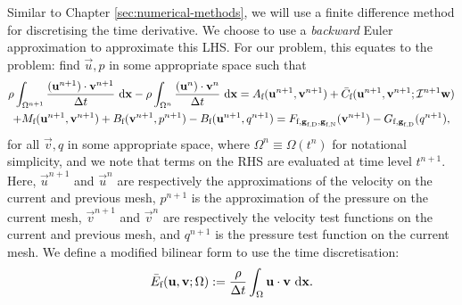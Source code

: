             Similar to Chapter \ref{sec:numerical-methods}, we will use a finite difference method for discretising the time derivative. We choose to use a \textit{backward} Euler approximation to approximate this LHS. For our problem, this equates to the problem: find $\vec{u}, p$ in some appropriate space such that
            \begin{multline*}
                \rho \int_{\Omega^{n+1}} \frac{(\boldsymbol{\mathbf{u}}^{n+1}) \cdot \boldsymbol{\mathbf{v}}^{n+1}}{\Delta t} ~\mathrm{d} \boldsymbol{\mathbf{x}} - \rho \int_{\Omega^n} \frac{(\boldsymbol{\mathbf{u}}^n) \cdot \boldsymbol{\mathbf{v}}^n}{\Delta t} ~\mathrm{d} \boldsymbol{\mathbf{x}} = A_\text{f}(\boldsymbol{\mathbf{u}}^{n+1}, \boldsymbol{\mathbf{v}}^{n+1}) + \bar{C}_\text{f}(\boldsymbol{\mathbf{u}}^{n+1}, \boldsymbol{\mathbf{v}}^{n+1}; \mathcal{I}^{n+1}\boldsymbol{\mathbf{w}}) \\ + M_\text{f}(\boldsymbol{\mathbf{u}}^{n+1}, \boldsymbol{\mathbf{v}}^{n+1}) + B_\text{f}(\boldsymbol{\mathbf{v}}^{n+1}, p^{n+1}) - B_\text{f}(\boldsymbol{\mathbf{u}}^{n+1}, q^{n+1}) = F_{\text{f},\boldsymbol{\mathbf{g}}_\text{f,D},\boldsymbol{\mathbf{g}}_\text{f,N}}(\boldsymbol{\mathbf{v}}^{n+1}) - G_{\text{f},\boldsymbol{\mathbf{g}}_\text{f,D}}(q^{n+1}),
            \end{multline*}
            for all $\vec{v}, q$ in some appropriate space, where $\Omega^n \equiv \Omega(t^n)$ for notational simplicity, and we note that terms on the RHS are evaluated at time level $t^{n+1}$. Here, $\vec{u}^{n+1}$ and $\vec{u}^n$ are respectively the approximations of the velocity on the current and previous mesh, $p^{n+1}$ is the approximation of the pressure on the current mesh, $\vec{v}^{n+1}$ and $\vec{v}^n$ are respectively the velocity test functions on the current and previous mesh, and $q^{n+1}$ is the pressure test function on the current mesh. We define a modified bilinear form to use the time discretisation:
            \begin{equation}
                \bar{E}_\text{f}(\boldsymbol{\mathbf{u}}, \boldsymbol{\mathbf{v}}; \Omega) := \frac{\rho}{\Delta t} \int_{\Omega} \boldsymbol{\mathbf{u}} \cdot \boldsymbol{\mathbf{v}} ~\mathrm{d} \boldsymbol{\mathbf{x}}.
            \end{equation}
            
